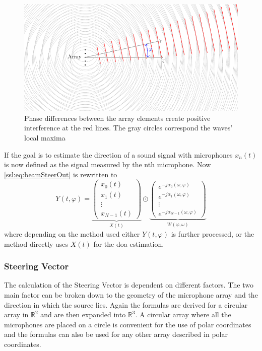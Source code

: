 \begin{figure}
	\centering
	\includegraphics[]{beamforming_1.pdf}
	\caption{Phase differences between the array elements create positive interference at the red lines.
		The gray circles correspond the waves' local maxima}
	\label{ssl:fig:beamforming1}
\end{figure}

If the goal is to estimate the direction of a sound signal with microphones 
$x_n(t)$ is now defined as the signal measured by the nth microphone.
Now \eqref{ssl:eq:beamSteerOut} is rewritten to 
\begin{equation}
  \label{ssl:eq:beamSteerIn}
  Y(t, \varphi) = 
    \underbrace{
      \begin{pmatrix} 
        x_0(t) \\ 
        x_1(t) \\
        \vdots \\ 
        x_{N-1}(t)
    \end{pmatrix}}_{X(t)}
    \odot
    \underbrace{
      \begin{pmatrix} 
        e^{-j\alpha_0(\omega, \varphi)} \\ 
        e^{-j\alpha_1(\omega, \varphi)} \\
        \vdots \\ 
        e^{-j\alpha_{N-1}(\omega, \varphi)} 
      \end{pmatrix}}_{W(\varphi, \omega)}
\end{equation}
where depending on the method used either $Y(t, \varphi)$ is further processed, or the 
method directly uses $X(t)$ for the \acrshort*{doa} estimation.

\subsubsection{Steering Vector}
The calculation of the Steering Vector is dependent on different factors.
The two main factor can be broken down to the geometry of the microphone array
and the direction in which the source lies. 
Again the formulas are derived for a circular array in $\mathbb{R}^2$ and are then expanded into $\mathbb{R}^3$.
A circular array where all the microphones are 
placed on a circle is convenient for the use of polar coordinates and the 
formulas can also be used for any other array described in polar coordinates.

